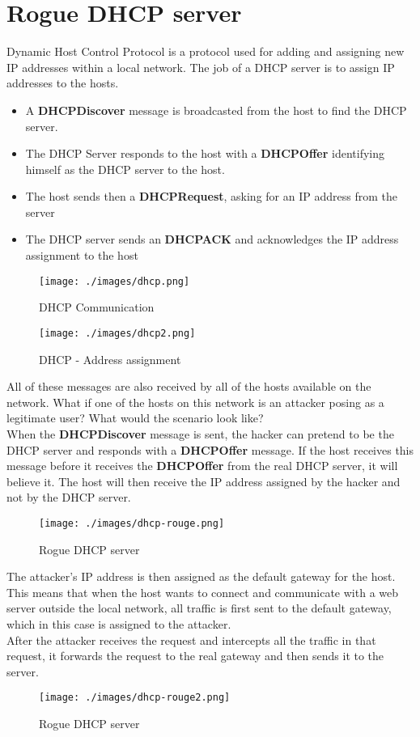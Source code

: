 \chapter{Rogue DHCP server}
Dynamic Host Control Protocol is a protocol used for adding and assigning new IP addresses within a local network.
The job of a DHCP server is to assign IP addresses to the hosts.
\begin{itemize}
    \item A \textbf{DHCPDiscover} message is broadcasted from the host to find the DHCP server.
    \item The DHCP Server responds to the host with a \textbf{DHCPOffer} identifying himself as the DHCP server to the host. 
    \item The host sends then a \textbf{DHCPRequest}, asking for an IP address from the server
    \item The DHCP server sends an \textbf{DHCPACK} and acknowledges the IP address assignment to the host
\end{itemize}

\begin{figure}[H]
    \centering
    \texttt{[image: ./images/dhcp.png]}
    \caption{DHCP Communication} 
\end{figure}

\begin{figure}[H]
    \centering
    \texttt{[image: ./images/dhcp2.png]}
    \caption{DHCP - Address assignment} 
\end{figure}

All of these messages are also received by all of the hosts available on the network.
What if one of the hosts on this network is an attacker posing as a legitimate user? What would the scenario look like? \\
When the \textbf{DHCPDiscover} message is sent, the hacker can pretend to be the DHCP server and responds with a \textbf{DHCPOffer} message. If the host receives this message before it receives the \textbf{DHCPOffer} from the real DHCP server, it will believe it. The host will then receive the IP address assigned by the hacker and not by the DHCP server. \\
\begin{figure}[H]
    \centering
    \texttt{[image: ./images/dhcp-rouge.png]}
    \caption{Rogue DHCP server} 
\end{figure}

The attacker's IP address is then assigned as the default gateway for the host. 
This means that when the host wants to connect and communicate with a web server outside the local network, all traffic is first sent to the default gateway, which in this case is assigned to the attacker. \\
After the attacker receives the request and intercepts all the traffic in that request, it forwards the request to the real gateway and then sends it to the server. \\
\begin{figure}[H]
    \centering
    \texttt{[image: ./images/dhcp-rouge2.png]}
    \caption{Rogue DHCP server} 
\end{figure}

